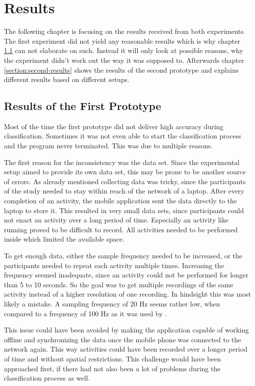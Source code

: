 \section{Results}
\label{section:results}
The following chapter is focusing on the results received from both experiments. The first experiment did not yield any reasonable results which is why chapter \ref{section:first-results} can not elaborate on such. Instead it will only look at possible reasons, why the experiment didn't work out the way it was supposed to. Afterwards chapter \ref{section:second-results} shows the results of the second prototype and explains different results based on different setups.




\subsection{Results of the First Prototype}
\label{section:first-results}
Most of the time the first prototype did not deliver high accuracy during classification. Sometimes it was not even able to start the classification process and the program never terminated. This was due to multiple reasons.

The first reason for the inconsistency was the data set. Since the experimental setup aimed to provide its own data set, this may be prone to be another source of errors. As already mentioned collecting data was tricky, since the participants of the study needed to stay within reach of the network of a laptop. After every completion of an activity, the mobile application sent the data directly to the laptop to store it. This resulted in very small data sets, since participants could not enact an activity over a long period of time. Especially an activity like running proved to be difficult to record. All activities needed to be performed inside which limited the available space.

To get enough data, either the sample frequency needed to be increased, or the participants needed to repeat each activity multiple times. Increasing the frequency seemed inadequate, since an activity could not be performed for longer than 5 to 10 seconds. So the goal was to get multiple recordings of the same activity instead of a higher resolution of one recording. In hindsight this was most likely a mistake. A sampling frequency of 20 Hz seems rather low, when compared to a frequency of 100 Hz as it was used by \textcite{xue2010naturalistic}.

This issue could have been avoided by making the application capable of working offline and synchronizing the data once the mobile phone was connected to the network again. This way activities could have been recorded over a longer period of time and without spatial restrictions. This challenge would have been approached first, if there had not also been a lot of problems during the classification process as well.

